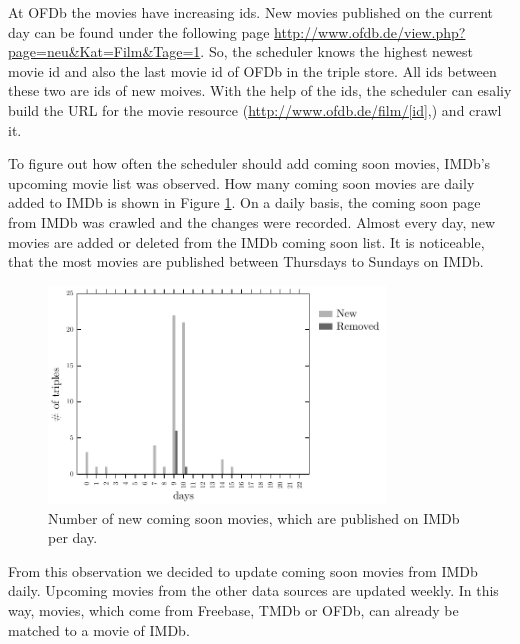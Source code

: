 At OFDb the movies have increasing ids.
New movies published on the current day can be found under the following page \url{http://www.ofdb.de/view.php?page=neu&Kat=Film&Tage=1}.
So, the scheduler knows the highest newest movie id and also the last movie id of OFDb in the triple store.
All ids between these two are ids of new moives.
With the help of the ids, the scheduler can esaliy build the URL for the movie resource (\url{http://www.ofdb.de/film/[id],}) and crawl it.

To figure out how often the scheduler should add coming soon movies, IMDb's upcoming movie list was observed.
How many coming soon movies are daily added to IMDb is shown in Figure \ref{fig_coming_soon_movie}.
On a daily basis, the coming soon page from IMDb was crawled and the changes were recorded.
Almost every day, new movies are added or deleted from the IMDb coming soon list.
It is noticeable, that the most movies are published between Thursdays to Sundays on IMDb.

\begin{figure}[h!]
  \begin{center}
  \includegraphics[width=0.8\textwidth]{images/updating_1.pdf}
  \end{center}
  \caption{Number of new coming soon movies, which are published on IMDb per day.}
  \label{fig_coming_soon_movie}
\end{figure}

From this observation we decided to update coming soon movies from IMDb daily.
Upcoming movies from the other data sources are updated weekly.
In this way, movies, which come from Freebase, TMDb or OFDb, can already be matched to a movie of IMDb.

